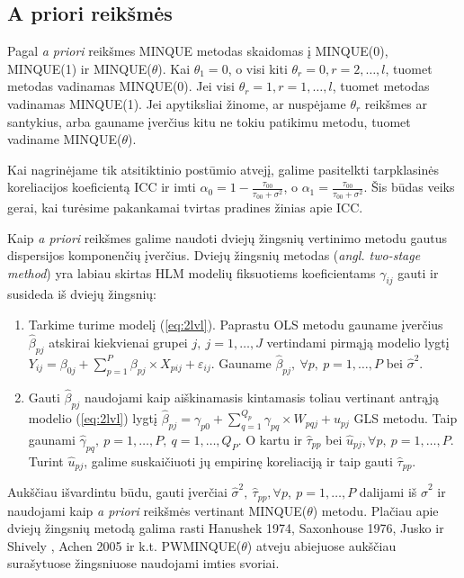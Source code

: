 \documentclass[12pt,a4paper]{article}
\begin{document}
\subsection{A priori reikšmės}\label{subsubsec:apriori}
\indent Pagal \textit{a priori} reikšmes MINQUE metodas skaidomas į MINQUE(0), MINQUE(1) ir MINQUE($\theta$). Kai $\theta_1=0$, o visi kiti $\theta_r=0, r = 2,\dots,l$, tuomet metodas vadinamas MINQUE(0). Jei visi $\theta_r=1, r=1,\dots,l$, tuomet metodas vadinamas MINQUE(1). Jei apytiksliai žinome, ar nuspėjame $\theta_r$ reikšmes ar santykius, arba gauname įverčius kitu ne tokiu patikimu metodu, tuomet vadiname MINQUE($\theta$).

\indent Kai nagrinėjame tik atsitiktinio postūmio atvejį, galime pasitelkti tarpklasinės koreliacijos koeficientą ICC ir imti $\alpha_0=1-\frac{\tau_{00}}{\tau_{00}+\sigma^2}$, o $\alpha_1=\frac{\tau_{00}}{\tau_{00}+\sigma^2}$. Šis būdas veiks gerai, kai turėsime pakankamai tvirtas pradines žinias apie ICC\cite{delpish}.

\indent Kaip \textit{a priori} reikšmes galime naudoti dviejų žingsnių vertinimo metodu gautus dispersijos komponenčių įverčius. Dviejų žingsnių metodas (\textit{angl. two-stage method}) yra labiau skirtas HLM modelių fiksuotiems koeficientams $\gamma_{ij}$ gauti ir susideda iš dviejų žingsnių:
\begin{enumerate}
\item Tarkime turime modelį (\ref{eq:2lvl}). Paprastu OLS metodu gauname įverčius $\hat{\beta}_{pj}$ atskirai kiekvienai grupei $j,\ j=1,\dots,J$ vertindami pirmąją modelio lygtį $Y_{ij} = \beta_{0j}+\sum^P_{p = 1} \beta_{pj}\times X_{pij}+\varepsilon_{ij}$. Gauname $\hat{\beta}_{pj}, \ \forall p,\ p=1,\dots,P$ bei $\hat{\sigma}^2$.
\item Gauti $\hat{\beta}_{pj}$ naudojami kaip aiškinamasis kintamasis toliau vertinant antrąją modelio (\ref{eq:2lvl}) lygtį $\hat{\beta}_{pj} = \gamma_{p0} + \sum^{Q_p}_{q=1}\gamma_{pq}\times W_{pqj}+u_{pj}$ GLS metodu. Taip gaunami $\hat{\gamma}_{pq}, \ p=1,\dots,P,\  q=1,\dots,Q_P$. O kartu ir $\hat{\tau}_{pp}$ bei $\hat{u}_{pj}, \forall p,\ p=1,\dots,P$. Turint $\hat{u}_{pj}$, galime suskaičiuoti jų empirinę koreliaciją ir taip gauti $\hat{\tau}_{pp}$.
\end{enumerate}

\indent Aukščiau išvardintu būdu, gauti įverčiai $\hat{\sigma}^2,\ \hat{\tau}_{pp}, \forall p,\ p=1,\dots,P$ dalijami iš $\hat{\sigma}^2$ ir naudojami kaip \textit{a priori} reikšmės vertinant MINQUE($\theta$) metodu. Plačiau apie dviejų žingsnių metodą galima rasti Hanushek 1974\cite{hanushek}, Saxonhouse 1976\cite{saxonhouse}, Jusko ir Shively \cite{jusko},  Achen 2005\cite{achen} ir k.t. PWMINQUE($\theta$) atveju abiejuose aukščiau surašytuose žingsniuose naudojami imties svoriai.
\end{document}
